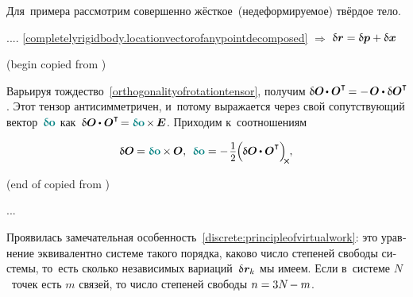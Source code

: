 \begin{otherlanguage}{russian}
Для~примера рассмотрим совершенно жёсткое~(недеформируемое) твёрдое тело.

.... \eqref{completelyrigidbody.locationvectorofanypointdecomposed} ${\Rightarrow}$
${\updelta\hspace{-0.1ex}\bm{r} = \updelta\hspace{-0.1ex}\bm{p} + \updelta\hspace{-0.1ex}\bm{x}}$

(begin copied from )

Варьируя тождество~\eqref{orthogonalityofrotationtensor}, получим ${\variation{\rotationtensor} \hspace{-0.2ex} \dotp \rotationtensor^{\T} \hspace{-0.2ex} = - \hspace{.2ex} \rotationtensor \dotp \variation{\rotationtensor}^{\T}\!}$.
Этот тензор антисимметричен, и~потому выражается через свой сопутствующий вектор~${\varvector{o}}$ как~${\variation{\rotationtensor} \hspace{-0.1ex} \dotp \rotationtensor^{\T} \hspace{-0.3ex} = \varvector{o} \hspace{-0.2ex} \times \hspace{-0.2ex} \UnitDyad}$.
Приходим к~соотношениям

\nopagebreak\vspace{-0.5em}\begin{equation}
\variation{\rotationtensor} \hspace{-0.1ex} = \varvector{o} \hspace{-0.1ex} \times \hspace{-0.1ex} \rotationtensor , \:\:
\varvector{o} = - \hspace{.2ex} \scalebox{.93}{$ \displaystyle\onehalf $} \hspace{-0.1ex} \Bigl( \hspace{-0.1ex} \variation{\rotationtensor} \hspace{-0.1ex} \dotp \rotationtensor^{\T} \Bigr)_{\hspace{-0.25em}\Xcompanion}
\hspace{-0.1ex} ,
\end{equation}

(end of copied from )

...


Проявилась замечательная особенность~\eqref{discrete:principleofvirtualwork}: это уравнение эквивалентно системе такого порядка, каково число степеней свободы системы, то~есть сколько независимых вариаций~${\variation{\hspace{.1ex}\locationvector_k}}$ мы имеем.
Если в~системе $N$~точек есть $m$ связей, то число степеней свободы ${n = 3N \hspace{-0.25ex} - m}$.


\end{otherlanguage}
